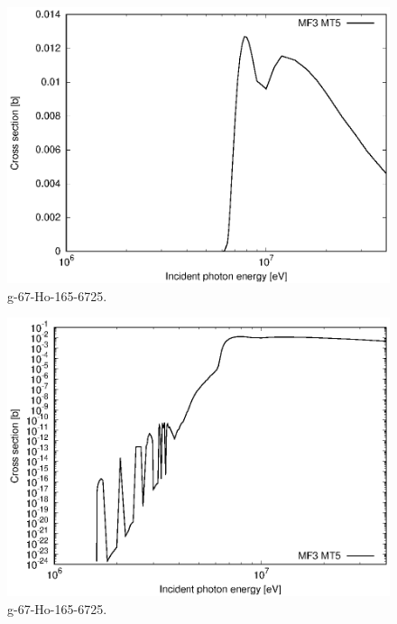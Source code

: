 \begin{figure}
 \includegraphics[width=\linewidth]{eps/g_67-Ho-165_6725.eps}
  \caption{g-67-Ho-165-6725.}
\end{figure}
\begin{figure}
 \includegraphics[width=\linewidth]{eps-log/g_67-Ho-165_6725.eps}
 \caption{g-67-Ho-165-6725.}
\end{figure}
\newpage \clearpage

